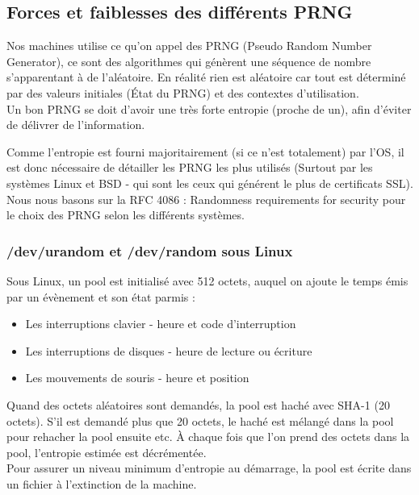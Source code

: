 \subsection{Forces et faiblesses des différents PRNG}

	Nos machines utilise ce qu'on appel des PRNG (Pseudo Random Number Generator), 
	ce sont des algorithmes qui génèrent une séquence de nombre s'apparentant
	à de l'aléatoire. En réalité rien est aléatoire car tout est déterminé par
	des valeurs initiales (État du PRNG) et des contextes d'utilisation.\\
	
	Un bon PRNG se doit d'avoir une très forte entropie (proche de un), afin
	d'éviter de délivrer de l'information.

	Comme l'entropie est fourni majoritairement (si ce n'est totalement) par 
	l'OS, il est donc nécessaire de détailler les PRNG les plus utilisés
	(Surtout par les systèmes Linux et BSD - qui sont les ceux qui générent le
	plus de certificats SSL).\\

	Nous nous basons sur la RFC 4086 \cite{rfc4086}: 
	Randomness requirements for security
	pour le choix des PRNG selon les différents	systèmes.

	\subsubsection{/dev/urandom et /dev/random sous Linux}
	
		Sous Linux, un pool est initialisé avec 512 octets, auquel on ajoute
		le temps émis par un évènement et son état parmis : 
		\begin{itemize}
			\item Les interruptions clavier - heure et code d'interruption
			\item Les interruptions de disques - heure de lecture ou écriture
			\item Les mouvements de souris - heure et position\\
		\end{itemize}
	
		Quand des octets aléatoires sont demandés, la pool est haché avec SHA-1 
		(20 octets). S’il est demandé plus que 20 octets, le haché est mélangé 
		dans la pool pour rehacher la pool ensuite etc. À chaque fois que l’on 
		prend des octets dans la pool, l’entropie estimée est décrémentée.\\

		Pour assurer un niveau minimum d’entropie au démarrage, la pool est 
		écrite dans un fichier à l’extinction de la machine.\\

